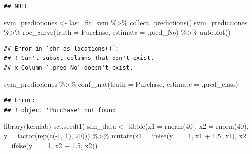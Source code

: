 \documentclass[
  12pt,
]{book}
\newenvironment{Shaded}{\begin{snugshade}}{\end{snugshade}}
\newcommand{\AttributeTok}[1]{\textcolor[rgb]{0.77,0.63,0.00}{#1}}
\newcommand{\DecValTok}[1]{\textcolor[rgb]{0.00,0.00,0.81}{#1}}
\newcommand{\FloatTok}[1]{\textcolor[rgb]{0.00,0.00,0.81}{#1}}
\newcommand{\FunctionTok}[1]{\textcolor[rgb]{0.00,0.00,0.00}{#1}}
\newcommand{\NormalTok}[1]{#1}
\newcommand{\OtherTok}[1]{\textcolor[rgb]{0.56,0.35,0.01}{#1}}
\newcommand{\SpecialCharTok}[1]{\textcolor[rgb]{0.00,0.00,0.00}{#1}}
\theoremstyle{definition}
\theoremstyle{definition}
\theoremstyle{definition}
\theoremstyle{definition}
\theoremstyle{remark}
\begin{document}
\begin{verbatim}
## NULL
\end{verbatim}

\begin{Shaded}
\begin{Highlighting}[]
\NormalTok{svm\_predicciones }\OtherTok{\textless{}{-}}\NormalTok{ last\_fit\_svm }\SpecialCharTok{\%\textgreater{}\%}
    \FunctionTok{collect\_predictions}\NormalTok{()}
\NormalTok{svm\_predicciones }\SpecialCharTok{\%\textgreater{}\%}
    \FunctionTok{roc\_curve}\NormalTok{(}\AttributeTok{truth =}\NormalTok{ Purchase, }\AttributeTok{estimate =}\NormalTok{ .pred\_No) }\SpecialCharTok{\%\textgreater{}\%}
    \FunctionTok{autoplot}\NormalTok{()}
\end{Highlighting}
\end{Shaded}

\begin{verbatim}
## Error in `chr_as_locations()`:
## ! Can't subset columns that don't exist.
## x Column `.pred_No` doesn't exist.
\end{verbatim}

\begin{Shaded}
\begin{Highlighting}[]
\NormalTok{svm\_predicciones }\SpecialCharTok{\%\textgreater{}\%}
    \FunctionTok{conf\_mat}\NormalTok{(}\AttributeTok{truth =}\NormalTok{ Purchase, }\AttributeTok{estimate =}\NormalTok{ .pred\_class)}
\end{Highlighting}
\end{Shaded}

\begin{verbatim}
## Error:
## ! object 'Purchase' not found
\end{verbatim}

\begin{Shaded}
\begin{Highlighting}[]
\FunctionTok{library}\NormalTok{(kernlab)}
\FunctionTok{set.seed}\NormalTok{(}\DecValTok{1}\NormalTok{)}
\NormalTok{sim\_data }\OtherTok{\textless{}{-}} \FunctionTok{tibble}\NormalTok{(}\AttributeTok{x1 =} \FunctionTok{rnorm}\NormalTok{(}\DecValTok{40}\NormalTok{), }\AttributeTok{x2 =} \FunctionTok{rnorm}\NormalTok{(}\DecValTok{40}\NormalTok{),}
    \AttributeTok{y =} \FunctionTok{factor}\NormalTok{(}\FunctionTok{rep}\NormalTok{(}\FunctionTok{c}\NormalTok{(}\SpecialCharTok{{-}}\DecValTok{1}\NormalTok{, }\DecValTok{1}\NormalTok{), }\DecValTok{20}\NormalTok{))) }\SpecialCharTok{\%\textgreater{}\%}
    \FunctionTok{mutate}\NormalTok{(}\AttributeTok{x1 =} \FunctionTok{ifelse}\NormalTok{(y }\SpecialCharTok{==} \DecValTok{1}\NormalTok{, x1 }\SpecialCharTok{+} \FloatTok{1.5}\NormalTok{, x1), }\AttributeTok{x2 =} \FunctionTok{ifelse}\NormalTok{(y }\SpecialCharTok{==}
        \DecValTok{1}\NormalTok{, x2 }\SpecialCharTok{+} \FloatTok{1.5}\NormalTok{, x2))}
\end{Highlighting}
\end{Shaded}
\end{document}

